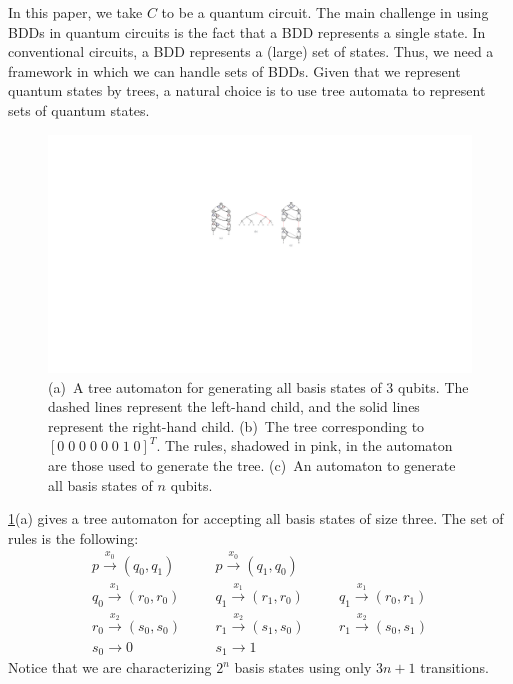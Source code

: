 In this paper, we take $C$ to be a quantum circuit.
%
%
The main challenge in using BDDs in quantum circuits is the fact that a BDD represents a single state.
%
In conventional circuits, a BDD represents a (large) set of states.
%
Thus, we need a framework in which we can handle sets of BDDs.
%
Given that we represent quantum states by trees, a natural choice is to use tree automata to represent sets of quantum states.
\begin{figure}[ht] 
    \centering
    \includegraphics[scale=0.8]{Figures/Automata/aut3} 
    \caption{(a)~A tree automaton for generating all basis states of $3$ qubits.
      The dashed lines represent the left-hand child, and the solid lines represent the right-hand child.
      (b)~The tree corresponding to $[0\;0\;0\;0\;0\;0\;1\;0]^T$. The rules, shadowed in pink, in the automaton are those used to generate the tree.
      (c)~An automaton to generate all basis states of $n$ qubits.}
    \label{automata:fig}
\end{figure}
%
\cref{automata:fig}(a) gives a tree automaton for accepting all basis states of size three.
%
The set of rules is the following:
\[
\begin{array}{lll}
p \xrightarrow{x_0} (q_0, q_1) &
\;\;\;\;\;\; p \xrightarrow{x_0} (q_1, q_0) & \\
q_0 \xrightarrow{x_1} (r_0, r_0) &
\;\;\;\;\;\; q_1 \xrightarrow{x_1} (r_1, r_0) &
\;\;\;\;\;\; q_1 \xrightarrow{x_1} (r_0, r_1) \\
r_0 \xrightarrow{x_2} (s_0, s_0) &
\;\;\;\;\;\; r_1 \xrightarrow{x_2} (s_1, s_0) &
\;\;\;\;\;\; r_1 \xrightarrow{x_2} (s_0, s_1) \\
s_0 \xrightarrow{} 0 &
\;\;\;\;\;\; s_1 \xrightarrow{} 1
\end{array}
\]
%
Notice that we are characterizing $2^n$ basis states using only $3n+1$ transitions.
